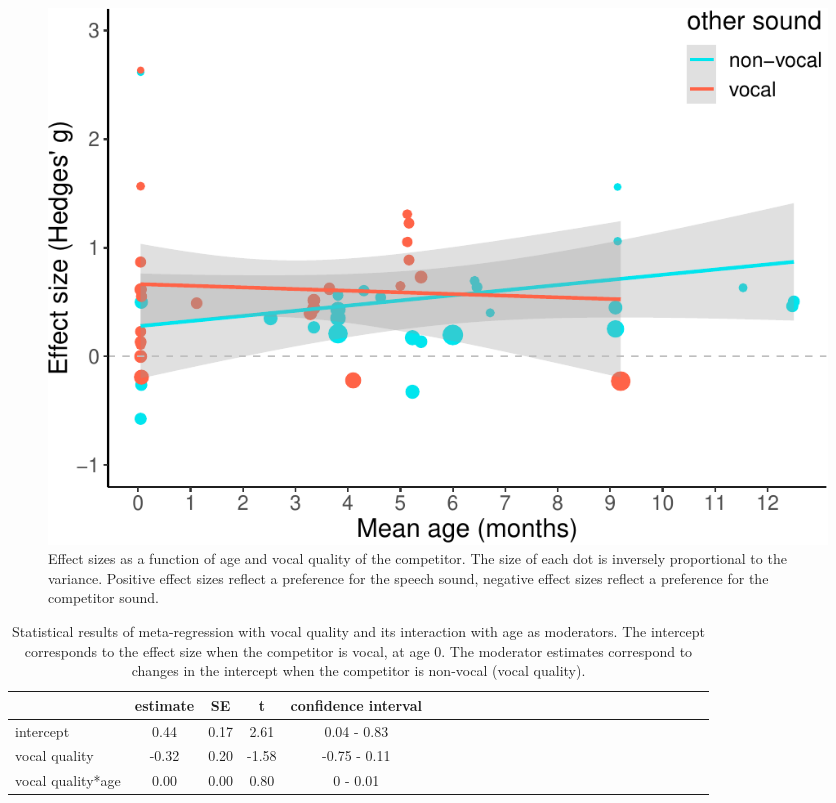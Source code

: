 \documentclass[man]{apa6}
\begin{document}
\begin{figure}
\centering
\includegraphics{MA_speech_pref_files/figure-latex/vocal-1.pdf}
\caption{\label{fig:vocal}Effect sizes as a function of age and vocal
quality of the competitor. The size of each dot is inversely
proportional to the variance. Positive effect sizes reflect a preference
for the speech sound, negative effect sizes reflect a preference for the
competitor sound.}
\end{figure}

\begin{table}[tbp]
\begin{center}
\begin{threeparttable}
\caption{\label{tab:TableVocal}Statistical results of meta-regression with vocal quality and its interaction with age as moderators. The intercept corresponds to the effect size when the competitor is vocal, at age 0. The moderator estimates correspond to changes in the intercept when the competitor is non-vocal (vocal quality).}
\begin{tabular}{lcccclcccclcccclcccclcccc}
\toprule
 & estimate & SE & t & confidence interval\\
\midrule
intercept & 0.44 & 0.17 & 2.61 & 0.04 - 0.83\\
vocal quality & -0.32 & 0.20 & -1.58 & -0.75 - 0.11\\
vocal quality*age & 0.00 & 0.00 & 0.80 & 0 - 0.01\\
\bottomrule
\end{tabular}
\end{threeparttable}
\end{center}
\end{table}
\end{document}
